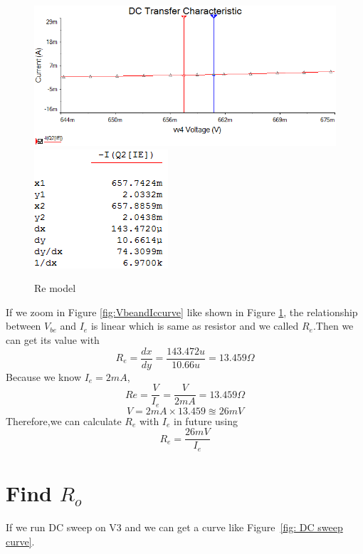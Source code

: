 \begin{figure}[htbp]
	\centering
	\includegraphics[scale=0.6]{"../Photo/Chap1/Re model"}\\[0.5cm]
	\includegraphics[scale=0.8]{"../Photo/Chap1/Re model data"}
	\caption{Re model}
	\label{fig:Re model}
\end{figure}

If we zoom in Figure \ref{fig:VbeandIccurve} like shown in Figure \ref{fig:Re model}, the relationship between $ V_{be} $ and $ I_e $ is linear which is same as resistor and we called $ R_e $.Then we can get its value with
\[ R_e = \frac{dx}{dy} = \frac{143.472u}{10.66u} = 13.459 \Omega\]
Because we know $ I_e = 2mA $, 
\[ Re = \frac{V}{I_e} = \frac{V}{2mA}=13.459\Omega\]
\[ V = 2mA \times 13.459 \approxeq 26mV \] 
Therefore,we can calculate $ R_{e} $ with $ I_e $ in future using
\begin{equation}
	R_{e} = \frac{26 mV}{I_{e}}
\end{equation}

\section{Find $R_o$} %
\label{sec:find_Ro}


If we run DC sweep on V3 and we can get a curve like Figure~\ref{fig: DC sweep curve}.

